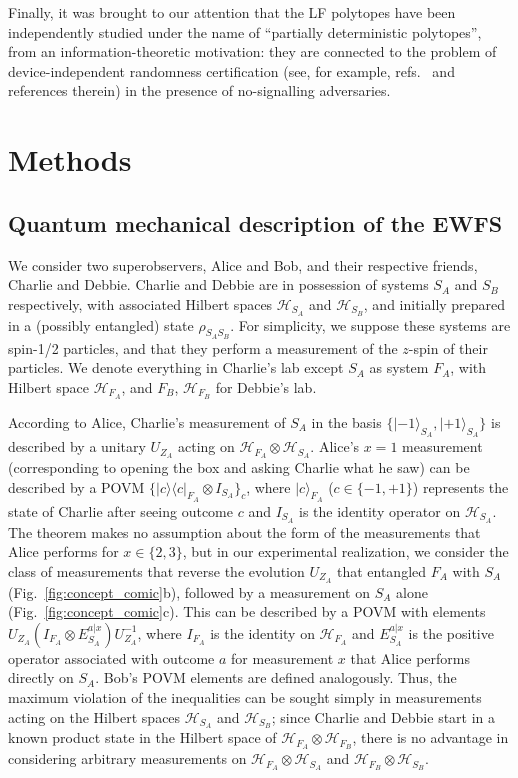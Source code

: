 \documentclass[aps,prx,twocolumn,superscriptaddress]{revtex4-1}
\theoremstyle{plain}
\newcommand{\ket}[1]{\ensuremath{|{#1}\rangle}}
\newcommand{\proj}[2]{\ensuremath{|{#1}\rangle\langle{#2}|}}
\begin{document}
Finally, it was brought to our attention that the LF polytopes have been independently studied
under the name of ``partially deterministic polytopes''\cite{Woodhead2014}, from an information-theoretic motivation: they are connected to the problem of device-independent randomness certification (see, for example, refs.~\cite{Colbeck2009,PironioNature2010,AcinNature2016} and references therein) in the presence of no-signalling adversaries. 

\section{Methods}

\subsection{Quantum mechanical description of the EWFS}
We consider two superobservers, Alice and Bob, and their respective friends, Charlie and Debbie. Charlie and Debbie are in possession of systems $S_A$ and $S_B$ respectively, with associated Hilbert spaces $\mathcal{H}_{S_A}$ and $\mathcal{H}_{S_B}$, and initially prepared in a (possibly entangled) state $\rho_{S_AS_B}$. For simplicity, we suppose these systems are spin-1/2 particles, and that they perform a measurement of the $z$-spin of their particles. We denote everything in Charlie's lab except $S_A$ as system $F_A$, with Hilbert space $\mathcal{H}_{F_A}$, and $F_B$, $\mathcal{H}_{F_B}$ for Debbie's lab. 

According to Alice, Charlie's measurement of $S_A$ in the basis $\{\ket{-1}_{S_A},\ket{+1}_{S_A}\}$ is described by a unitary $U_{Z_A}$ acting on $\mathcal{H}_{F_A}\otimes\mathcal{H}_{S_A}$. Alice's $x=1$ measurement (corresponding to opening the box and asking Charlie what he saw) can be described by a POVM $\{\proj{c}{c}_{F_A}\otimes I_{S_A}\}_c$, where  $\ket{c}_{F_A}$ ($c \in \{-1,+1\}$) represents the state of Charlie after seeing outcome $c$ and $I_{S_A}$ is the identity operator on $\mathcal{H}_{S_A}$. 
The theorem makes no assumption about the form of the measurements that Alice performs for $x\in\{2,3 \}$, but in our experimental realization, we consider the class of measurements that reverse the evolution $U_{Z_A}$ that entangled $F_A$ with $S_A$ (Fig.\ \ref{fig:concept_comic}b), followed by a measurement on $S_A$ alone (Fig.\ \ref{fig:concept_comic}c). This can be described by a POVM with elements $U_{Z_A}(I_{F_A}\otimes E_{S_A}^{a|x})U_{Z_A}^{-1}$, where $I_{F_A}$ is the identity on $\mathcal{H}_{F_A}$ and $E_{S_A}^{a|x}$ is the positive operator associated with outcome $a$ for measurement $x$ that Alice performs directly on $S_A$.
Bob's POVM elements  
are defined analogously. Thus, the maximum violation of the inequalities can be sought simply in measurements acting on the Hilbert spaces  $\mathcal{H}_{S_A}$ and $\mathcal{H}_{S_B}$; since Charlie and Debbie start in a known product state in the Hilbert space of $\mathcal{H}_{F_A}\otimes\mathcal{H}_{F_B}$, there is no advantage in considering arbitrary measurements on $\mathcal{H}_{F_A}\otimes\mathcal{H}_{S_A}$ and $\mathcal{H}_{F_B}\otimes\mathcal{H}_{S_B}$.
\end{document}
